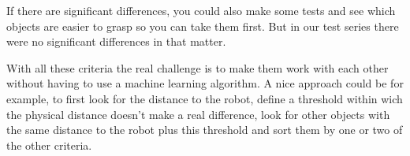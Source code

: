 \documentclass[main.tex]{subfiles}
\begin{document}
		If there are significant differences, you could also make some tests and see which objects are easier to grasp so you can take them first. But in our test series there were no significant differences in that matter. 
		
		With all these criteria the real challenge is to make them work with each other without having to use a machine learning algorithm. A nice approach could be for example, to first look for the distance to the robot, define a threshold within wich the physical distance doesn't make a real difference, look for other objects with the same distance to the robot plus this threshold and sort them by one or two of the other criteria. 
		

	\endgroup
\end{document}
